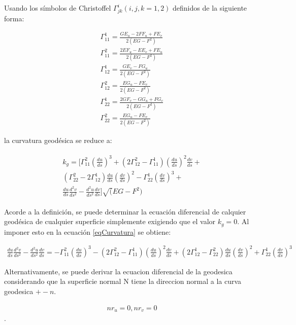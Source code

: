 \documentclass{endm}
\begin{document}
Usando los s\'imbolos de Christoffel $\Gamma_{jk}^i (i,j,k=1,2)$ definidos de la siguiente forma:

\begin{align} 
\Gamma_{11}^1 = \frac{GE_u - 2 FF_u + FE_v}{2(EG - F^2)} \label{Gam_11_1}\\
\Gamma_{11}^2 = \frac{2EF_u - EE_v + FE_u}{2(EG - F^2)}\label{Gam_11_2}\\
\Gamma_{12}^1 = \frac{GE_v - FG_u}{2(EG - F^2)} \label{Gam_12_1}\\
\Gamma_{12}^2 = \frac{EG_u - FE_v}{2(EG - F^2)}\label{Gam_12_2}\\
\Gamma_{22}^1 = \frac{2GF_v - GG_u + FG_v}{2(EG - F^2)} \label{Gam_22_1}\\
\Gamma_{22}^2 = \frac{EG_u - FE_v}{2(EG - F^2)}\label{Gam_22_2}
\end{align}


la curvatura geod\'esica se reduce a:

\begin{align} 
\begin{split}
k_g = [ \Gamma_{11}^2 (\frac{du}{ds})^3 + (2 \Gamma_{12}^2 -  \Gamma_{11}^1 ) (\frac{du}{ds})^2 \frac{dv}{ds} +\\ (\Gamma_{22}^2 -  2 \Gamma_{12}^1 ) \frac{du}{ds} (\frac{dv}{ds})^2 - \Gamma_{22}^1 (\frac{dv}{ds})^3 +\\ \frac{du}{ds} \frac{d^2v}{ds^2} - \frac{d^2u}{ds^2} \frac{dv}{ds}] \sqrt(EG - F^2)
\label{eqCurvatura}
\end{split}
\end{align}

Acorde a la definici\'on, se puede determinar la ecuaci\'on diferencial de calquier geod\'esica de cualquier superficie simplemente exigiendo que el valor $k_g = 0$. Al imponer esto en la ecuaci\'on \ref{eqCurvatura} se obtiene:

\begin{align} 
\frac{du}{ds} \frac{d^2v}{ds^2} - \frac{d^2u}{ds^2} \frac{dv}{ds} = -  \Gamma_{11}^2 (\frac{du}{ds})^3 - (2 \Gamma_{12}^2 -  \Gamma_{11}^1 ) (\frac{du}{ds})^2 \frac{dv}{ds} + (2 \Gamma_{12}^1 - \Gamma_{22}^2) \frac{du}{ds} (\frac{dv}{ds})^2 + \Gamma_{22}^1 (\frac{dv}{ds})^3
\label{eqCurvatura}
\end{align}

Alternativamente, se puede derivar la ecuacion diferencial de la geodesica considerando que la superficie normal N tiene la direccion normal a la curva geodesica $+- n$.

\begin{align} 
n r_u = 0, n r_v = 0
\label{equcurvatura_nr}
\end{align}.
\end{document}
